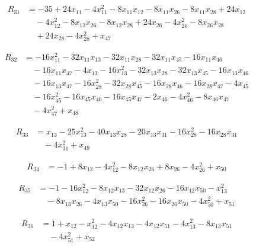 \begin{align*}
R_{31} &= -35 +24 x_{11} -4 x_{11}^{2} -8 x_{11} x_{12} -8 x_{11} x_{26} -8 x_{11} x_{28} +24 x_{12} \\
&\quad -4 x_{12}^{2} -8 x_{12} x_{26} -8 x_{12} x_{28} +24 x_{26} -4 x_{26}^{2} -8 x_{26} x_{28} \\
&\quad +24 x_{28} -4 x_{28}^{2} +x_{47}
\end{align*}

\begin{align*}
R_{32} &= -16 x_{11}^{2} -32 x_{11} x_{13} -32 x_{11} x_{28} -32 x_{11} x_{45} -16 x_{11} x_{46} \\
&\quad -16 x_{11} x_{47} -4 x_{13} -16 x_{13}^{2} -32 x_{13} x_{28} -32 x_{13} x_{45} -16 x_{13} x_{46} \\
&\quad -16 x_{13} x_{47} -16 x_{28}^{2} -32 x_{28} x_{45} -16 x_{28} x_{46} -16 x_{28} x_{47} -4 x_{45} \\
&\quad -16 x_{45}^{2} -16 x_{45} x_{46} -16 x_{45} x_{47} -2 x_{46} -4 x_{46}^{2} -8 x_{46} x_{47} \\
&\quad -4 x_{47}^{2} +x_{48}
\end{align*}

\begin{align*}
R_{33} &= x_{13} -25 x_{13}^{2} -40 x_{13} x_{28} -20 x_{13} x_{31} -16 x_{28}^{2} -16 x_{28} x_{31} \\
&\quad -4 x_{31}^{2} +x_{49}
\end{align*}

\begin{align*}
R_{34} &= -1 +8 x_{12} -4 x_{12}^{2} -8 x_{12} x_{26} +8 x_{26} -4 x_{26}^{2} +x_{50}
\end{align*}

\begin{align*}
R_{35} &= -1 -16 x_{12}^{2} -8 x_{12} x_{13} -32 x_{12} x_{26} -16 x_{12} x_{50} -x_{13}^{2} \\
&\quad -8 x_{13} x_{26} -4 x_{13} x_{50} -16 x_{26}^{2} -16 x_{26} x_{50} -4 x_{50}^{2} +x_{51}
\end{align*}

\begin{align*}
R_{36} &= 1 +x_{12} -x_{12}^{2} -4 x_{12} x_{13} -4 x_{12} x_{51} -4 x_{13}^{2} -8 x_{13} x_{51} \\
&\quad -4 x_{51}^{2} +x_{52}
\end{align*}

